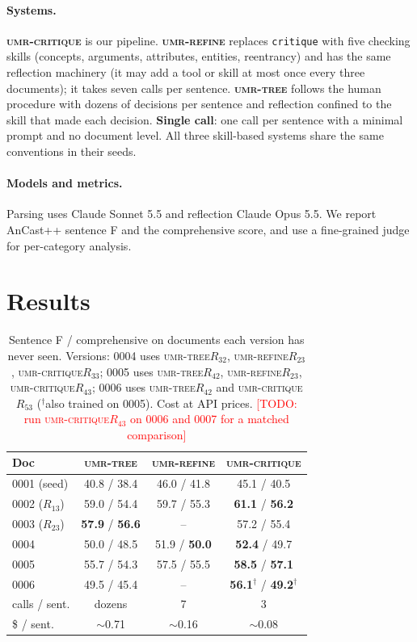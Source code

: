 \documentclass[11pt]{article}
\newcommand{\sys}{\textsc{umr-critique}\xspace}
\newcommand{\tree}{\textsc{umr-tree}\xspace}
\newcommand{\refine}{\textsc{umr-refine}\xspace}
\newcommand{\skill}[1]{\texttt{#1}}
\newcommand{\todo}[1]{\textcolor{red}{[TODO: #1]}}
\begin{document}
\paragraph{Systems.}
\textbf{\sys} is our pipeline. \textbf{\refine} replaces \skill{critique} with five checking skills (concepts, arguments, attributes, entities, reentrancy) and has the same reflection machinery (it may add a tool or skill at most once every three documents); it takes seven calls per sentence. \textbf{\tree} \citep{anon2026orchestration} follows the human procedure with dozens of decisions per sentence and reflection confined to the skill that made each decision. \textbf{Single call}: one call per sentence with a minimal prompt and no document level. All three skill-based systems share the same conventions in their seeds.

\paragraph{Models and metrics.}
Parsing uses Claude Sonnet 5.5 and reflection Claude Opus 5.5. We report AnCast++ \citep{sun2024ancast} sentence F and the comprehensive score, and use a fine-grained judge for per-category analysis.

\section{Results}

\begin{table}[t]
\centering\small
\setlength{\tabcolsep}{3pt}
\begin{tabular}{@{}lccc@{}}
\toprule
Doc & \tree & \refine & \sys \\
\midrule
0001 (seed) & 40.8 / 38.4 & 46.0 / 41.8 & 45.1 / 40.5 \\
0002 ($R_{13}$) & 59.0 / 54.4 & 59.7 / 55.3 & \textbf{61.1} / \textbf{56.2} \\
0003 ($R_{23}$) & \textbf{57.9} / \textbf{56.6} & -- & 57.2 / 55.4 \\
0004 & 50.0 / 48.5 & 51.9 / \textbf{50.0} & \textbf{52.4} / 49.7 \\
0005 & 55.7 / 54.3 & 57.5 / 55.5 & \textbf{58.5} / \textbf{57.1} \\
0006 & 49.5 / 45.4 & -- & \textbf{56.1}$^\dagger$ / \textbf{49.2}$^\dagger$ \\
\midrule
calls / sent. & dozens & 7 & 3 \\
\$ / sent. & $\sim$0.71 & $\sim$0.16 & $\sim$0.08 \\
\bottomrule
\end{tabular}
\caption{Sentence F / comprehensive on documents each version has never seen. Versions: 0004 uses \tree $R_{32}$, \refine $R_{23}$, \sys $R_{33}$; 0005 uses \tree $R_{42}$, \refine $R_{23}$, \sys $R_{43}$; 0006 uses \tree $R_{42}$ and \sys $R_{53}$ ($^\dagger$also trained on 0005). Cost at API prices. \todo{run \sys $R_{43}$ on 0006 and 0007 for a matched comparison}}
\label{tab:main}
\end{table}
\end{document}
